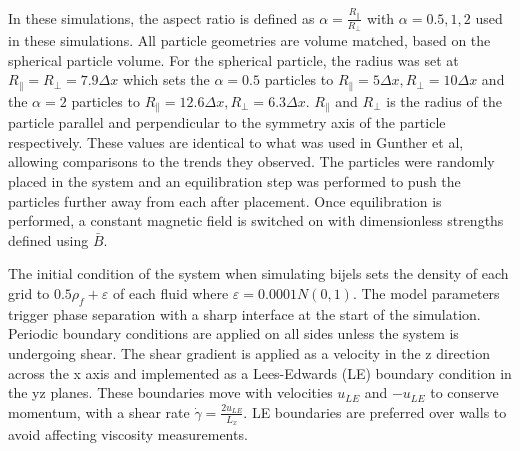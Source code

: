 In these simulations, the aspect ratio is defined as $\alpha = \frac{R_{\parallel}}{R_{\perp}}$ with $\alpha = 0.5, 1, 2$ 
used in these simulations. All particle geometries are volume matched, based on the spherical particle volume. For the 
spherical particle, the radius was set at $R_{\parallel} = R_{\perp} = 7.9 \Delta x$ which sets the $\alpha = 0.5$ particles to 
$R_{\parallel} = 5 \Delta x, R_{\perp} = 10 \Delta x$ and the $\alpha = 2$ particles to $R_{\parallel} = 12.6 \Delta x, R_{\perp} = 6.3 \Delta x$. 
$R_{\parallel}$ and $R_{\perp}$ is the radius of the particle parallel and perpendicular to the symmetry axis of 
the particle respectively. These values are identical to what was used in Gunther et al, allowing comparisons to the 
trends they observed. \cite{gunther_timescales_2014} The particles were randomly placed in the system and an equilibration
step was performed to push the particles further away from each after placement. Once equilibration is performed, a 
constant magnetic field is switched on with dimensionless strengths defined using $\bar{B}$.

The initial condition of the system when simulating bijels sets the density of each grid to $0.5\rho_f + \varepsilon$ of 
each fluid where $\varepsilon = 0.0001N(0,1)$. The model parameters trigger phase separation with a sharp interface at 
the start of the simulation. Periodic boundary conditions are applied on all sides unless the system is undergoing shear. 
The shear gradient is applied as a velocity in the z direction across the x axis and implemented as a Lees-Edwards 
(LE) boundary condition in the yz planes. \cite{wagner_leesedwards_2002, lorenz_lees-edwards_2009, yang_capillary_2022} 
These boundaries move with velocities $u_{LE}$ and $-u_{LE}$ to conserve momentum, with a shear rate 
$\dot{\gamma} = \frac{2 u_{LE}}{L_x}$. LE boundaries are preferred over walls to avoid affecting viscosity measurements. 
\cite{wagner_leesedwards_2002, lorenz_lees-edwards_2009, yang_capillary_2022}

